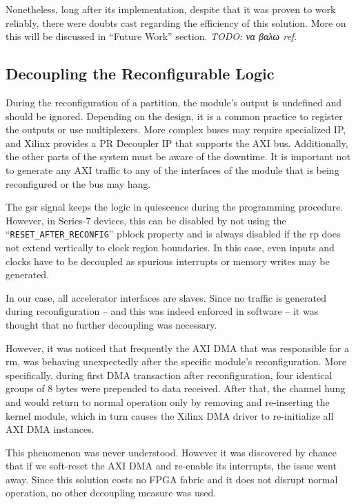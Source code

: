Nonetheless, long after its implementation, despite that it was proven to work reliably,
there were doubts cast regarding the efficiency of this solution. 
More on this will be discussed in ``Future Work'' section. \emph{TODO: να βαλω ref}.

\subsection{Decoupling the Reconfigurable Logic}

During the reconfiguration of a partition, the module's output is undefined and should be ignored.
Depending on the design, it is a common practice to register the outputs or use multiplexers.
More complex buses may require specialized IP, and Xilinx provides a PR Decoupler IP that
supports the AXI bus. Additionally, the other parts of the system must be aware of the downtime.
It is important not to generate any AXI traffic to any of the interfaces of the module that is
being reconfigured or the bus may hang.

The \gls{gsr} signal keeps the logic in quiescence during the programming procedure.
However, in Series-7 devices, this can be disabled by not using the ``\texttt{RESET\_AFTER\_RECONFIG}''
\gls{pblock} property and is always disabled if the \gls{rp} 
does not extend vertically to clock region boundaries.
In this case, even inputs and clocks have to be decoupled as spurious interrupts or memory writes
may be generated.

In our case, all accelerator interfaces are slaves. 
Since no traffic is generated during reconfiguration
-- and this was indeed enforced in software --
it was thought that no further decoupling was necessary. 

However, it was noticed that frequently the AXI DMA that was responsible for
a \gls{rm}, was behaving unexpectedly after the specific module's reconfiguration.
More specifically, during first DMA transaction after reconfiguration, four identical
groups of 8 bytes were prepended to data received. After that, the channel hung
and would return to normal operation only by removing and re-inserting the kernel module,
which in turn causes the Xilinx DMA driver to re-initialize all AXI DMA instances.

This phenomenon was never understood. However it was discovered by chance that
if we soft-reset the AXI DMA and re-enable its interrupts, the issue went away.
Since this solution costs no FPGA fabric and it does not disrupt normal operation,
no other decoupling measure was used.

